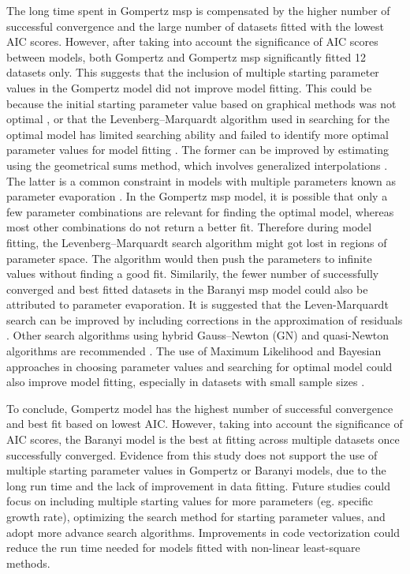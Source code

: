 \documentclass[11pt]{article}
\begin{document}
The long time spent in Gompertz msp is compensated by the higher number of successful convergence and the large number of datasets fitted with the lowest AIC scores. However, after taking into account the significance of AIC scores between models, both Gompertz and Gompertz msp significantly fitted 12 datasets only. This suggests that the inclusion of multiple starting parameter values in the Gompertz model did not improve model fitting. This could be because the initial starting parameter value based on graphical methods was not optimal \cite{holmstrom_review_2002}, or that the Levenberg–Marquardt algorithm used in searching for the optimal model has limited searching ability and failed to identify more optimal parameter values for model fitting \cite{transtrum_improvements_2012}. The former can be improved by estimating using the geometrical sums method, which involves generalized interpolations \cite{holmstrom_review_2002}. The latter is a common constraint in models with multiple parameters known as parameter evaporation \cite{transtrum_why_2010}. In the Gompertz msp model, it is possible that only a few parameter combinations are relevant for finding the optimal model, whereas most other combinations do not return a better fit. Therefore during model fitting, the Levenberg–Marquardt search algorithm might got lost in regions of parameter space. The algorithm would then push the parameters to infinite values without finding a good fit. Similarily, the fewer number of successfully converged and best fitted datasets in the Baranyi msp model could also be attributed to parameter evaporation. It is suggested that the Leven-Marquardt search can be improved by including corrections in the approximation of residuals \cite{transtrum_improvements_2012}. Other search algorithms using hybrid Gauss–Newton (GN) and quasi-Newton algorithms are recommended \cite{holmstrom_review_2002}. The use of Maximum Likelihood and Bayesian approaches in choosing parameter values and searching for optimal model could also improve model fitting, especially in datasets with small sample sizes \cite{zondervan-zwijnenburg_pushing_2018}. 
\vspace{\baselineskip}

To conclude, Gompertz model has the highest number of successful convergence and best fit based on lowest AIC. However, taking into account the significance of AIC scores, the Baranyi model is the best at fitting across multiple datasets once successfully converged. Evidence from this study does not support the use of multiple starting parameter values in Gompertz or Baranyi models, due to the long run time and the lack of improvement in data fitting. Future studies could focus on including multiple starting values for more parameters (eg. specific growth rate), optimizing the search method for starting parameter values, and adopt more advance search algorithms. Improvements in code vectorization could reduce the run time needed for models fitted with non-linear least-square methods. 
\vspace{\baselineskip}








\end{document}
